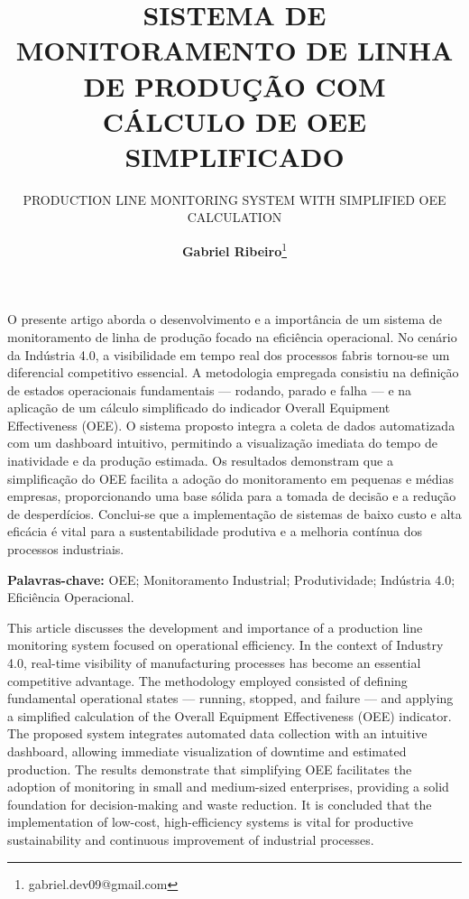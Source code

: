 \documentclass[12pt]{unisenaiclass}
\title{SISTEMA DE MONITORAMENTO DE LINHA DE PRODUÇÃO COM CÁLCULO DE OEE SIMPLIFICADO}
\subtitle{PRODUCTION LINE MONITORING SYSTEM WITH SIMPLIFIED OEE CALCULATION}
\author{%
  \textbf{Gabriel Ribeiro}\thanks{gabriel.dev09@gmail.com}%
}
\begin{document}
\maketitle

\begin{resumo}
O presente artigo aborda o desenvolvimento e a importância de um sistema de monitoramento de linha de produção focado na eficiência operacional. No cenário da Indústria 4.0, a visibilidade em tempo real dos processos fabris tornou-se um diferencial competitivo essencial. A metodologia empregada consistiu na definição de estados operacionais fundamentais — rodando, parado e falha — e na aplicação de um cálculo simplificado do indicador Overall Equipment Effectiveness (OEE). O sistema proposto integra a coleta de dados automatizada com um dashboard intuitivo, permitindo a visualização imediata do tempo de inatividade e da produção estimada. Os resultados demonstram que a simplificação do OEE facilita a adoção do monitoramento em pequenas e médias empresas, proporcionando uma base sólida para a tomada de decisão e a redução de desperdícios. Conclui-se que a implementação de sistemas de baixo custo e alta eficácia é vital para a sustentabilidade produtiva e a melhoria contínua dos processos industriais.
\end{resumo}

\begin{justify}
    \textbf{Palavras-chave:} OEE; Monitoramento Industrial; Produtividade; Indústria 4.0; Eficiência Operacional.
\end{justify}

\begin{abstract1}
This article discusses the development and importance of a production line monitoring system focused on operational efficiency. In the context of Industry 4.0, real-time visibility of manufacturing processes has become an essential competitive advantage. The methodology employed consisted of defining fundamental operational states — running, stopped, and failure — and applying a simplified calculation of the Overall Equipment Effectiveness (OEE) indicator. The proposed system integrates automated data collection with an intuitive dashboard, allowing immediate visualization of downtime and estimated production. The results demonstrate that simplifying OEE facilitates the adoption of monitoring in small and medium-sized enterprises, providing a solid foundation for decision-making and waste reduction. It is concluded that the implementation of low-cost, high-efficiency systems is vital for productive sustainability and continuous improvement of industrial processes.
\end{abstract1}
\end{document}
